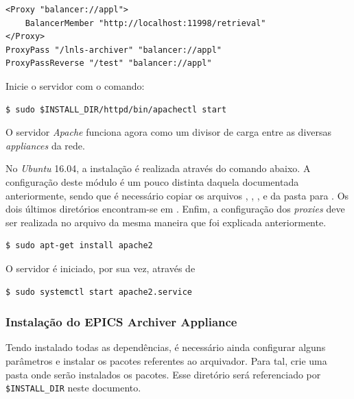 \begin {enumerate}[i.]
\begin{lstlisting}[keywordstyle=\ttfamily, style=nonumbers]
<Proxy "balancer://appl">
    BalancerMember "http://localhost:11998/retrieval"
</Proxy>
ProxyPass "/lnls-archiver" "balancer://appl"
ProxyPassReverse "/test" "balancer://appl"
\end{lstlisting}

Inicie o servidor com o comando:

\begin{lstlisting}[keywordstyle=\ttfamily, style=nonumbers]
$ sudo $INSTALL_DIR/httpd/bin/apachectl start
\end{lstlisting}

O servidor \textit{Apache} funciona agora como um divisor de carga entre as
diversas \textit{appliances} da rede.

\vspace{12pt}

No \textit{Ubuntu} 16.04, a instalação é realizada através do comando abaixo. A
configuração deste módulo é um pouco distinta daquela documentada anteriormente,
sendo que é necessário copiar os arquivos ,
, ,  e
 da pasta  para
. Os dois últimos diretórios encontram-se em
. Enfim, a configuração dos \textit{proxies} deve ser
realizada no arquivo  da mesma maneira que foi explicada
anteriormente.

\begin{lstlisting}[keywordstyle=\ttfamily, style=nonumbers]
$ sudo apt-get install apache2
\end{lstlisting}

O servidor é iniciado, por sua vez, através de 

\begin{lstlisting}[keywordstyle=\ttfamily, style=nonumbers]
$ sudo systemctl start apache2.service
\end{lstlisting}

\end{enumerate} 

\subsubsection {Instalação do EPICS Archiver Appliance}
\label{sec:epicsappl}

Tendo instalado todas as dependências, é necessário ainda configurar
alguns parâmetros e instalar os pacotes referentes ao arquivador. Para tal, crie
uma pasta onde serão instalados os pacotes. Esse diretório será referenciado por
\texttt{\$INSTALL\_DIR} neste documento.

